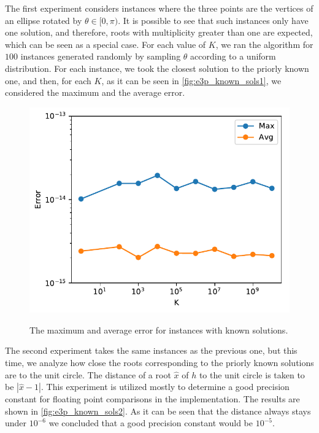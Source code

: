 The first experiment considers instances where the three points are the vertices of an ellipse rotated by $\theta\in[0, \pi)$. It is possible to see that such instances only have one solution, and therefore, roots with multiplicity greater than one are expected, which can be seen as a special case. 
For each value of $K$, we ran the algorithm for $100$ instances generated randomly by sampling $\theta$ according to a uniform distribution. For each instance, we took the closest solution to the priorly known one, and then, for each $K$, as it can be seen in \autoref{fig:e3p_known_sols1}, we considered the maximum and the average error.
\begin{figure}[H]
	\centering
	\caption{The maximum and average error for instances with known solutions.}
	\includegraphics[scale=.8]{tex/figures/e3p_known_sols1}
	\fautor
	\label{fig:e3p_known_sols1}
\end{figure}
The second experiment takes the same instances as the previous one, but this time, we analyze how close the roots corresponding to the priorly known solutions are to the unit circle. The distance of a root $\hat{x}$ of $h$ to the unit circle is taken to be $|\hat{x}-1|$. This experiment is utilized mostly to determine a good precision constant for floating point comparisons in the implementation. The results are shown in \autoref{fig:e3p_known_sols2}. As it can be seen that the distance always stays under $10^{-6}$ we concluded that a good precision constant would be $10^{-5}$.
